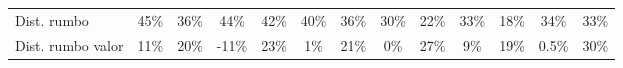 \documentclass[12pt,a4paper]{article}
\begin{document}
\begin{table}[H]
{\begin{tabular}{l|cc|cc|cc|cc|cc|cc|}
\rowcolor[rgb]{0.855,0.91,0.988} Dist. rumbo                                                                                                                                                  & 45\%                                               & 36\%                                               & 44\%                                               & 42\%                                               & 40\%                                               & 36\%                                               & 30\%                                               & 22\%                                               & 33\%                                               & 18\%                                               & 34\%                                               & 33\%                                                \\
\rowcolor[rgb]{0.925,0.957,1} Dist. rumbo valor                                                                                                                                               & 11\%                                               & 20\%                                               & -11\%                                              & 23\%                                               & 1\%                                                & 21\%                                               & 0\%                                                & 27\%                                               & 9\%                                                & 19\%                                               & 0.5\%                                              & 30\%                                               
\end{tabular}}
\end{table}
\end{document}
